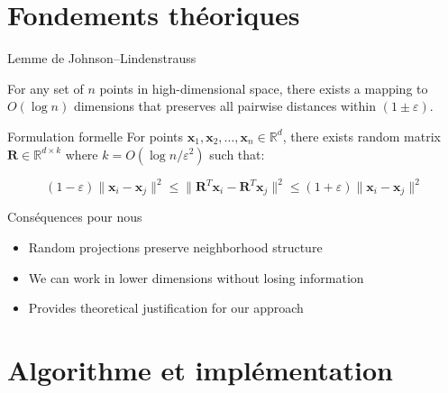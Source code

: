 \documentclass[9pt,aspectratio=169,professionalfonts]{beamer}
\begin{document}
\section{Fondements théoriques}

\begin{frame}{Lemme de Johnson–Lindenstrauss}
\begin{theorem}
For any set of $n$ points in high-dimensional space, there exists a mapping to $O(\log n)$ dimensions that preserves all pairwise distances within $(1\pm\varepsilon)$.
\end{theorem}

\begin{block}{Formulation formelle}
For points $\mathbf{x}_1, \mathbf{x}_2, \ldots, \mathbf{x}_n \in \mathbb{R}^d$, there exists random matrix $\mathbf{R} \in \mathbb{R}^{d \times k}$ where $k = O(\log n/\varepsilon^2)$ such that:

$$\boxed{(1-\varepsilon)\lVert\mathbf{x}_i - \mathbf{x}_j\rVert^2 \leq \lVert\mathbf{R}^T \mathbf{x}_i - \mathbf{R}^T \mathbf{x}_j\rVert^2 \leq (1+\varepsilon)\lVert\mathbf{x}_i - \mathbf{x}_j\rVert^2}$$
\end{block}

\begin{block}{Conséquences pour nous}
\begin{itemize}
    \item Random projections preserve neighborhood structure
    \item We can work in lower dimensions without losing information
    \item Provides theoretical justification for our approach
\end{itemize}
\end{block}
\end{frame}

\section{Algorithme et implémentation}
\end{document}
